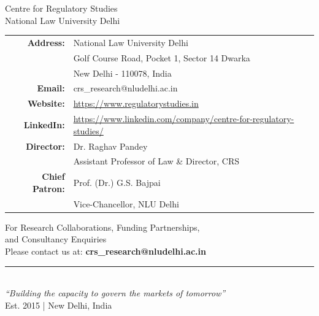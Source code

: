 \documentclass[11pt,a4paper]{article}
\begin{document}
\vspace{1cm}

\begin{center}
\begin{tcolorbox}[colback=vellum,colframe=oxblood,width=0.9\textwidth,arc=3mm,boxrule=2pt]
\centering
{\headingfont\Large\textcolor{oxblood}{Centre for Regulatory Studies}}\\[0.3cm]
{\large National Law University Delhi}\\[1cm]

\begin{tabular}{rl}
\textbf{Address:} & National Law University Delhi\\
& Golf Course Road, Pocket 1, Sector 14 Dwarka\\
& New Delhi - 110078, India\\[0.5cm]

\textbf{Email:} & crs\_research@nludelhi.ac.in\\[0.3cm]

\textbf{Website:} & \url{https://www.regulatorystudies.in}\\[0.3cm]

\textbf{LinkedIn:} & \url{https://www.linkedin.com/company/centre-for-regulatory-studies/}\\[0.5cm]

\textbf{Director:} & Dr. Raghav Pandey\\
& Assistant Professor of Law \& Director, CRS\\[0.3cm]

\textbf{Chief Patron:} & Prof. (Dr.) G.S. Bajpai\\
& Vice-Chancellor, NLU Delhi\\
\end{tabular}
\end{tcolorbox}
\end{center}

\vspace{1cm}

\begin{center}
\begin{tcolorbox}[colback=ink,colframe=goldthread,coltext=vellum,width=0.9\textwidth,arc=3mm]
\centering
{\headingfont\large For Research Collaborations, Funding Partnerships,}\\
{\headingfont\large and Consultancy Enquiries}\\[0.5cm]
Please contact us at: \textbf{crs\_research@nludelhi.ac.in}
\end{tcolorbox}
\end{center}

\vfill

\begin{center}
\rule{0.5\textwidth}{0.4pt}\\[0.3cm]
{\small\textit{``Building the capacity to govern the markets of tomorrow''}}\\[0.2cm]
{\small Est. 2015 | New Delhi, India}
\end{center}
\end{document}
